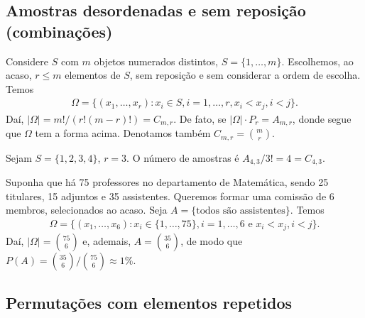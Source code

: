\documentclass[../Notas.tex]{subfiles}
\begin{document}
\subsection{Amostras desordenadas e sem reposição (combinações)}
Considere $S$ com $m$ objetos numerados distintos, $S = \{1, \dots, m\}$. Escolhemos, ao acaso, $r\leq m$ elementos de $S$, sem reposição e sem considerar a ordem de escolha. Temos
\begin{align*}
    \Omega = \{ (x_1, \dots, x_r) : x_i\in S, i=1,\dots, r, x_i < x_j, i<j \}.
\end{align*}
Daí, $|\Omega| = m!/(r!(m-r)!) = C_{m,r}$. De fato, se $|\Omega|\cdot P_r = A_{m,r}$, donde segue que $\Omega$ tem a forma acima. Denotamos também $C_{m,r} = \binom{m}{r}$.
\begin{example}
Sejam $S = \{ 1, 2, 3, 4 \}$, $r=3$. O número de amostras é $A_{4,3}/3! = 4 = C_{4,3}$.
\end{example}
\begin{example}
Suponha que há 75 professores no departamento de Matemática, sendo 25 titulares, 15 adjuntos e 35 assistentes. Queremos formar uma comissão de 6 membros, selecionados ao acaso. Seja $A = \{ \text{todos são assistentes} \}$. Temos
\begin{align*}
    \Omega = \{ (x_1, \dots, x_6) : x_i\in \{ 1, \dots, 75 \}, i=1,\dots, 6 \text{ e } x_i<x_j, i<j\}.
\end{align*}
Daí, $|\Omega| = \binom{75}{6}$ e, ademais, $A = \binom{35}{6}$, de modo que $P(A) = \binom{35}{6}/\binom{75}{6} \approx 1\%$.
\end{example}

\subsection{Permutações com elementos repetidos}
\end{document}
